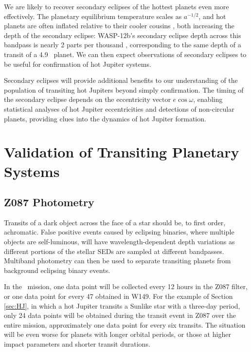 We are likely to recover secondary eclipses of the hottest planets even more effectively.
The planetary equilibrium temperature scales as $a^{-1/2}$, and hot planets are often 
inflated relative to their cooler cousins \citep{Charbonneau00, Showman02}, both increasing
the depth of the secondary eclipse:
WASP-12b's secondary eclipse depth across this bandpass is nearly 2 parts per thousand
\citep{Croll11, Stevenson14b}, corresponding to the same depth of a transit of a 
4.9 \rearth\ planet.
We can then expect observations of secondary eclipses to be useful for confirmation of
hot Jupiter systems.


Secondary eclipses will provide additional benefits to our understanding of the population
of transiting hot Jupiters beyond simply confirmation.
The timing of the secondary eclipse depends on the eccentricity vector $e \cos \omega$,
enabling statistical analyses of hot Jupiter eccentricities and detections of non-circular
planets, providing clues into the dynamics of hot Jupiter formation.


\section{Validation of Transiting Planetary Systems}
\label{sec:validate}


\subsection{Z087 Photometry}

Transits of a dark object across the face of a star should be, to first order, achromatic.
False positive events caused by eclipsing binaries, where multiple objects are
self-luminous, will have wavelength-dependent depth variations as different portions
of the stellar SEDs are sampled at different bandpasses.
Multiband photometry can then be used to separate transiting planets from 
background eclipsing binary events.

In the \WF\ mission, one data point will be collected every 12 hours in the Z087 filter,
or one data point for every 47 obtained in W149.
For the example of Section \ref{sec:HJ}, in which a hot Jupiter transits a Sunlike star with
a three-day period, only 24 data points will be obtained during the transit event in
Z087 over the entire mission, approximately one data point for every six transits.
The situation will be even worse for planets with longer orbital periods, or those 
at higher impact parameters and shorter transit durations.

